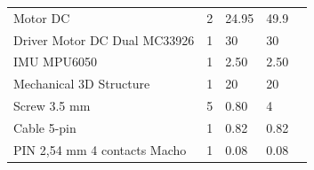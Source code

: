 \begin{table}[H]
{\begin{turn}{90}
\begin{tabular}{|l|l|l|l|l}
		Motor DC                                                        & 2                                         & 24.95                                                                                                               & 49.9                                                                                                             &  \\ \cline{1-4}
		Driver Motor DC Dual MC33926                                    & 1                                         & 30                                                                                                                  & 30                                                                                                               &  \\ \cline{1-4}
		IMU MPU6050                                                     & 1                                         & 2.50                                                                                                                & 2.50                                                                                                             &  \\ \cline{1-4}
		Mechanical 3D Structure                                         & 1                                         & 20                                                                                                                  & 20                                                                                                               &  \\ \cline{1-4}
		Screw 3.5 mm                                                    & 5                                         & 0.80                                                                                                                & 4                                                                                                                &  \\ \cline{1-4}
		Cable 5-pin                                                     & 1                                         & 0.82                                                                                                                & 0.82                                                                                                             &  \\ \cline{1-4}
		PIN 2,54 mm 4 contacts Macho                           & 1                                         & 0.08                                                                                                                & 0.08                                                                                                             &  \\ \cline{1-4}

\end{tabular}
\end{turn}}
\end{table}
